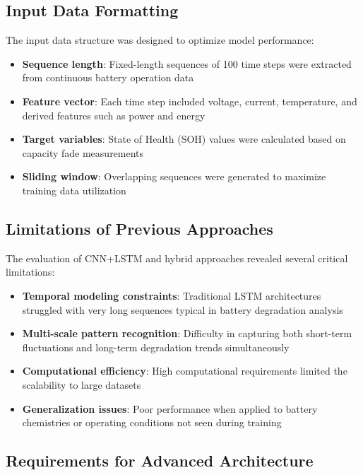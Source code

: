 \subsection{Input Data Formatting}

The input data structure was designed to optimize model performance:

\begin{itemize}
    \item \textbf{Sequence length}: Fixed-length sequences of 100 time steps were extracted from continuous battery operation data
    \item \textbf{Feature vector}: Each time step included voltage, current, temperature, and derived features such as power and energy
    \item \textbf{Target variables}: State of Health (SOH) values were calculated based on capacity fade measurements
    \item \textbf{Sliding window}: Overlapping sequences were generated to maximize training data utilization
\end{itemize}

\subsection{Limitations of Previous Approaches}

The evaluation of CNN+LSTM and hybrid approaches revealed several critical limitations:

\begin{itemize}
    \item \textbf{Temporal modeling constraints}: Traditional LSTM architectures struggled with very long sequences typical in battery degradation analysis
    \item \textbf{Multi-scale pattern recognition}: Difficulty in capturing both short-term fluctuations and long-term degradation trends simultaneously
    \item \textbf{Computational efficiency}: High computational requirements limited the scalability to large datasets
    \item \textbf{Generalization issues}: Poor performance when applied to battery chemistries or operating conditions not seen during training
\end{itemize}

\subsection{Requirements for Advanced Architecture}

